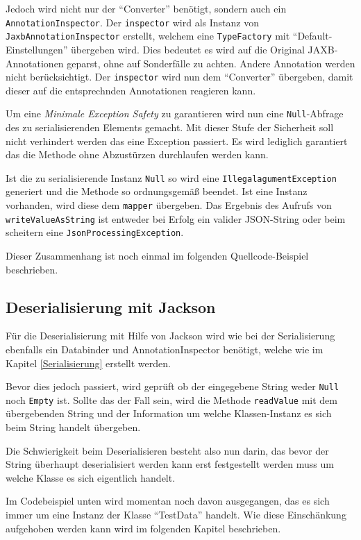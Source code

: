 Jedoch wird nicht nur der "`Converter"' ben\"otigt, sondern auch ein \texttt{AnnotationInspector}. Der \texttt{inspector} wird als Instanz von \texttt{JaxbAnnotationInspector} erstellt, welchem eine \texttt{TypeFactory} mit "`Default-Einstellungen"' \"ubergeben wird. Dies bedeutet es wird auf die Original JAXB-Annotationen geparst, ohne auf Sonderf\"alle zu achten. Andere Annotation werden nicht ber\"ucksichtigt. Der \texttt{inspector} wird nun dem "`Converter"' \"ubergeben, damit dieser auf die entsprechnden Annotationen reagieren kann.

Um eine \textit{Minimale Exception Safety} zu garantieren wird nun eine \texttt{Null}-Abfrage des zu serialisierenden Elements gemacht. Mit dieser Stufe der Sicherheit soll nicht verhindert werden das eine Exception passiert. Es wird lediglich garantiert das die Methode ohne Abzust\"urzen durchlaufen werden kann. \cite{ExceptionSafety}

Ist die zu serialisierende Instanz \texttt{Null} so wird eine \texttt{IllegalagumentException} generiert und die Methode so ordnungsgem\"a\ss{} beendet. Ist eine Instanz vorhanden, wird diese dem \texttt{mapper} \"ubergeben. Das Ergebnis des Aufrufs von \texttt{writeValueAsString} ist entweder bei Erfolg ein valider JSON-String oder beim scheitern eine \texttt{JsonProcessingException}.

Dieser Zusammenhang ist noch einmal im folgenden Quellcode-Beispiel beschrieben.
\newpage


\subsection{Deserialisierung mit Jackson}
F\"ur die Deserialisierung mit Hilfe von Jackson wird wie bei der Serialisierung ebenfalls ein Databinder und AnnotationInspector ben\"otigt, welche wie im Kapitel \ref{Serialisierung} erstellt werden. 

Bevor dies jedoch passiert, wird gepr\"uft ob der eingegebene String weder \texttt{Null} noch \texttt{Empty} ist. 
Sollte das der Fall sein, wird die Methode \texttt{readValue} mit dem \"ubergebenden String und der Information um welche Klassen-Instanz es sich beim String handelt \"ubergeben.

Die Schwierigkeit beim Deserialisieren besteht also nun darin, das bevor der String \"uberhaupt deserialisiert werden kann erst festgestellt werden muss um welche Klasse es sich eigentlich handelt.

Im Codebeispiel unten wird momentan noch davon ausgegangen, das es sich immer um eine Instanz der Klasse "`TestData"' handelt. Wie diese Einsch\"ankung aufgehoben werden kann wird im folgenden Kapitel beschrieben.

